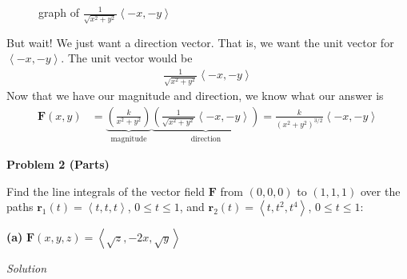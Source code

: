 \documentclass{article}
\newcommand{\lrp}[1]{\left( #1 \right)}
\newcommand{\lra}[1]{\left\langle #1 \right\rangle}
\renewcommand{\r}[0]{\mathbf{r}}
\newcommand{\F}[0]{\mathbf{F}}
\newcommand{\Solution}{\textit{Solution}}
\begin{document}
\begin{figure}[h]
\begin{minipage}{.5\textwidth}
\begin{tikzpicture}[x=0.75pt,y=0.75pt,yscale=-1,xscale=1]
\end{tikzpicture}

  \caption*{graph of $\frac{1}{\sqrt{x^2+y^2}}\lra{-x,-y}$}
  \label{fig:test2}
\end{minipage}
\end{figure}

But wait! We just want a direction vector. That is, we want the unit vector for $\lra{-x,-y}$. The unit vector would be
\begin{align*}
    \frac{1}{\sqrt{x^2+y^2}}\lra{-x,-y}
\end{align*}
Now that we have our magnitude and direction, we know what our answer is
\begin{align*}
    \F(x,y)&=\underbrace{\lrp{\frac{k}{x^2+y^2}}}_{\text{magnitude}}\underbrace{\lrp{\frac{1}{\sqrt{x^2+y^2}}\lra{-x,-y}}}_{\text{direction}}=\boxed{\frac{k}{(x^2+y^2)^{3/2}}\lra{-x,-y}}\tag{$k>0$}
\end{align*}
\newpage
{}
{}\textbf{Problem 2 (Parts)}

Find the line integrals of the vector field $\F$ from $(0,0,0)$ to $(1,1,1)$ over the paths $\r_1(t)=\lra{t,t,t}$, $0\leq t\leq 1$, and $\r_2(t)=\lra{t,t^2,t^4}$, $0\leq t\leq 1$:

{}\textbf{(a)} $\F(x,y,z)=\lra{\sqrt{z},-2x,\sqrt{y}}$

\Solution
\end{document}
